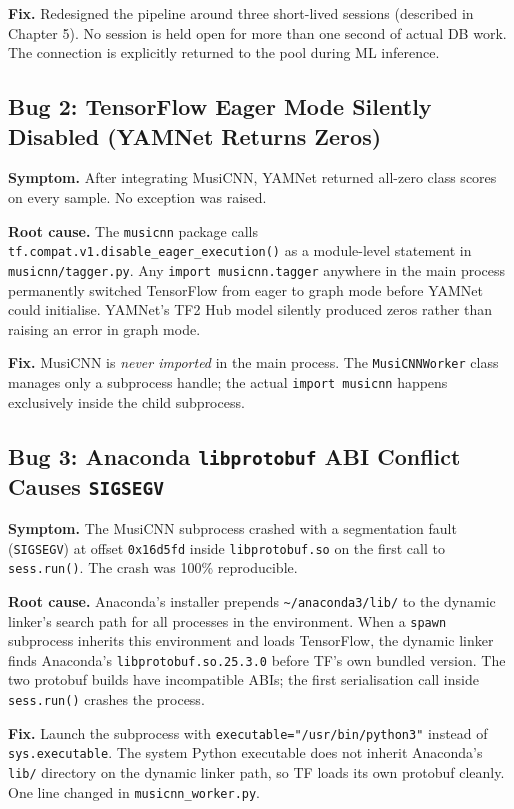 \documentclass[12pt,letterpaper]{report}
\begin{document}
\textbf{Fix.} Redesigned the pipeline around three short-lived sessions (described in Chapter 5). No session is held open for more than one second of actual DB work. The connection is explicitly returned to the pool during ML inference.

\subsection{Bug 2: TensorFlow Eager Mode Silently Disabled (YAMNet Returns Zeros)}

\textbf{Symptom.} After integrating MusiCNN, YAMNet returned all-zero class scores on every sample. No exception was raised.

\textbf{Root cause.} The \texttt{musicnn} package calls \texttt{tf.compat.v1.disable\_eager\_execution()} as a module-level statement in \texttt{musicnn/tagger.py}. Any \texttt{import musicnn.tagger} anywhere in the main process permanently switched TensorFlow from eager to graph mode before YAMNet could initialise. YAMNet's TF2 Hub model silently produced zeros rather than raising an error in graph mode.

\textbf{Fix.} MusiCNN is \textit{never imported} in the main process. The \texttt{MusiCNNWorker} class manages only a subprocess handle; the actual \texttt{import musicnn} happens exclusively inside the child subprocess.

\subsection{Bug 3: Anaconda \texttt{libprotobuf} ABI Conflict Causes \texttt{SIGSEGV}}

\textbf{Symptom.} The MusiCNN subprocess crashed with a segmentation fault (\texttt{SIGSEGV}) at offset \texttt{0x16d5fd} inside \texttt{libprotobuf.so} on the first call to \texttt{sess.run()}. The crash was 100\% reproducible.

\textbf{Root cause.} Anaconda's installer prepends \texttt{\textasciitilde/anaconda3/lib/} to the dynamic linker's search path for all processes in the environment. When a \texttt{spawn} subprocess inherits this environment and loads TensorFlow, the dynamic linker finds Anaconda's \texttt{libprotobuf.so.25.3.0} before TF's own bundled version. The two protobuf builds have incompatible ABIs; the first serialisation call inside \texttt{sess.run()} crashes the process.

\textbf{Fix.} Launch the subprocess with \texttt{executable="/usr/bin/python3"} instead of \texttt{sys.executable}. The system Python executable does not inherit Anaconda's \texttt{lib/} directory on the dynamic linker path, so TF loads its own protobuf cleanly. One line changed in \texttt{musicnn\_worker.py}.
\end{document}
